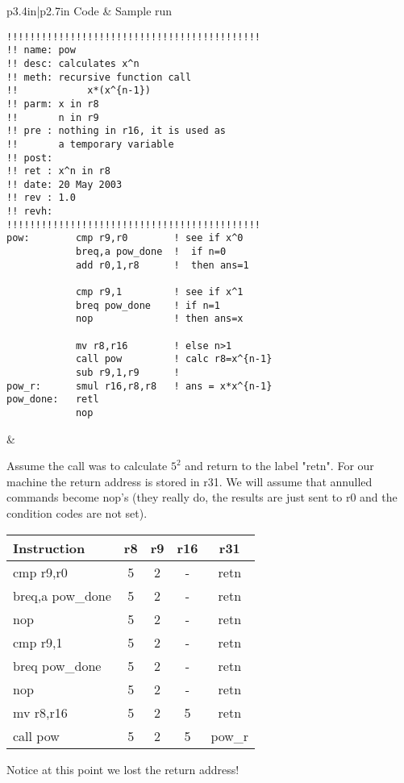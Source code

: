 \noindent
\begin{tabular}{p{3.4in}|p{2.7in}}
Code & Sample run \\ \hline
\begin{verbatim}
!!!!!!!!!!!!!!!!!!!!!!!!!!!!!!!!!!!!!!!!!!!!
!! name: pow
!! desc: calculates x^n
!! meth: recursive function call
!!            x*(x^{n-1})
!! parm: x in r8
!!       n in r9
!! pre : nothing in r16, it is used as
!!       a temporary variable
!! post:
!! ret : x^n in r8
!! date: 20 May 2003
!! rev : 1.0
!! revh:
!!!!!!!!!!!!!!!!!!!!!!!!!!!!!!!!!!!!!!!!!!!!
pow:        cmp r9,r0        ! see if x^0
            breq,a pow_done  !  if n=0
            add r0,1,r8      !  then ans=1

            cmp r9,1         ! see if x^1
            breq pow_done    ! if n=1
            nop              ! then ans=x

            mv r8,r16        ! else n>1
            call pow         ! calc r8=x^{n-1}
            sub r9,1,r9      !
pow_r:      smul r16,r8,r8   ! ans = x*x^{n-1}
pow_done:   retl
            nop
\end{verbatim}

&

Assume the call was to calculate $5^2$ and return to the label "retn".  For our machine the return address is stored in r31.  We will assume that annulled commands become nop's (they really do, the results are just sent to r0 and the condition codes are not set).

\begin{tabular}{lcccc}
  Instruction & r8 & r9 & r16 & r31 \\ \hline
  cmp r9,r0 & 5 & 2 & - & retn \\
  breq,a pow\_done & 5 & 2 & - & retn \\
  nop & 5 & 2 & - & retn \\
  cmp r9,1 & 5 & 2 & - & retn \\
  breq pow\_done & 5 & 2 & - & retn \\
  nop & 5 & 2 & - & retn \\
  mv r8,r16 & 5 & 2 & 5 & retn \\
  call pow & 5 & 2 & 5 & pow\_r \\
\end{tabular}

Notice at this point we lost the return address!


\end{tabular}
